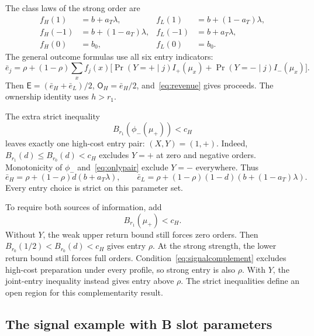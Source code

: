 \documentclass[12pt]{article}
\newcommand{\Ent}{\mathsf E}
\newcommand{\OH}{\mathsf O_H}
\begin{document}
The class laws of the strong order are
\[
 \begin{aligned}
 f_H(1)&=b+a_T\lambda,& f_L(1)&=b+(1-a_T)\lambda,\\
 f_H(-1)&=b+(1-a_T)\lambda,& f_L(-1)&=b+a_T\lambda,\\
 f_H(0)&=b_0,&f_L(0)&=b_0.
 \end{aligned}
\]
The general outcome formulas use all six entry indicators:
\begin{equation}\label{eq:signaloutcomes}
 \bar e_j=\rho+(1-\rho)\sum_xf_j(x)
 \big[\Pr(Y=+\mid j)I_+(\mu_x)+\Pr(Y=-\mid j)I_-(\mu_x)\big].
\end{equation}
Then $\Ent=(\bar e_H+\bar e_L)/2$, $\OH=\bar e_H/2$, and~\eqref{eq:revenue} gives proceeds.
The ownership identity uses $h>r_1$.

The extra strict inequality
\begin{equation}\label{eq:onlypair}
 B_{r_1}(\phi_-(\mu_+))<c_H
\end{equation}
leaves exactly one high-cost entry pair: $(X,Y)=(1,+)$.
Indeed, $B_{r_1}(d)\le B_{r_0}(d)<c_H$ excludes $Y=+$ at zero and negative orders.
Monotonicity of $\phi_-$ and~\eqref{eq:onlypair} exclude $Y=-$ everywhere.
Thus
\begin{equation}\label{eq:onepair}
 \bar e_H=\rho+(1-\rho)d(b+a_T\lambda),\qquad
 \bar e_L=\rho+(1-\rho)(1-d)(b+(1-a_T)\lambda).
\end{equation}
Every entry choice is strict on this parameter set.

To require both sources of information, add
\begin{equation}\label{eq:signalcomplement}
 B_{r_1}(\mu_+)<c_H.
\end{equation}
Without $Y$, the weak upper return bound still forces zero orders.
Then $B_{r_0}(1/2)<B_{r_0}(d)<c_H$ gives entry $\rho$.
At the strong strength, the lower return bound still forces full orders.
Condition~\eqref{eq:signalcomplement} excludes high-cost preparation under every profile, so strong entry is also $\rho$.
With $Y$, the joint-entry inequality instead gives entry above $\rho$.
The strict inequalities define an open region for this complementarity result.

\subsection{The signal example with B slot parameters}
\end{document}
